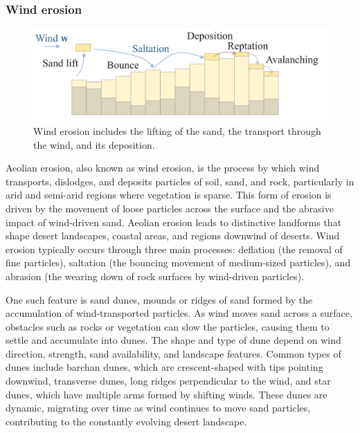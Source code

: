\subsubsection{Wind erosion}

\begin{figure}[h]
    \centering
    \includegraphics[width = 0.8 \linewidth]{wind_process.png}
    \caption{Wind erosion includes the lifting of the sand, the transport through the wind, and its deposition. }
    \label{fig:erosion_wind-erosion}
\end{figure}

Aeolian erosion, also known as wind erosion, is the process by which wind transports, dislodges, and deposits particles of soil, sand, and rock, particularly in arid and semi-arid regions where vegetation is sparse. This form of erosion is driven by the movement of loose particles across the surface and the abrasive impact of wind-driven sand. Aeolian erosion leads to distinctive landforms that shape desert landscapes, coastal areas, and regions downwind of deserts. Wind erosion typically occurs through three main processes: deflation (the removal of fine particles), saltation (the bouncing movement of medium-sized particles), and abrasion (the wearing down of rock surfaces by wind-driven particles).

One such feature is sand dunes, mounds or ridges of sand formed by the accumulation of wind-transported particles. As wind moves sand across a surface, obstacles such as rocks or vegetation can slow the particles, causing them to settle and accumulate into dunes. The shape and type of dune depend on wind direction, strength, sand availability, and landscape features. Common types of dunes include barchan dunes, which are crescent-shaped with tips pointing downwind, transverse dunes, long ridges perpendicular to the wind, and star dunes, which have multiple arms formed by shifting winds. These dunes are dynamic, migrating over time as wind continues to move sand particles, contributing to the constantly evolving desert landscape.

